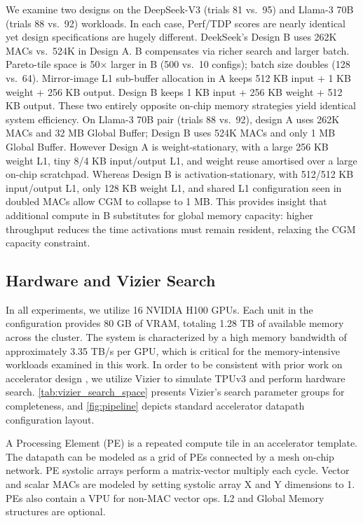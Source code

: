 We examine two designs on the DeepSeek-V3  (trials 81 vs.\ 95) and Llama-3 70B (trials 88 vs.\ 92) workloads. In each case, Perf/TDP scores are nearly identical yet design specifications are hugely different. DeekSeek's Design B uses 262K MACs vs.\ 524K in Design A. B compensates via richer search and larger batch. Pareto-tile space is 50$\times$ larger in B (500 vs.\ 10 configs); batch size doubles (128 vs.\ 64). Mirror-image L1 sub-buffer allocation in A keeps 512 KB input + 1 KB weight + 256 KB output. Design B keeps 1 KB input + 256 KB weight + 512 KB output. These two entirely opposite on-chip memory strategies yield identical system efficiency. On Llama-3 70B pair (trials 88 vs.\ 92), design A uses 262K MACs and 32 MB Global Buffer; Design B uses 524K MACs and only 1 MB Global Buffer. However Design A is weight-stationary, with a large 256 KB weight L1, tiny 8/4 KB input/output L1, and weight reuse amortised over a large on-chip scratchpad. Whereas Design B is activation-stationary, with 512/512 KB input/output L1, only 128 KB weight L1, and shared L1 configuration seen in doubled MACs allow CGM to collapse to 1 MB. This provides insight that additional compute in B substitutes for global memory capacity: higher throughput reduces the time activations must remain resident, relaxing the CGM capacity constraint. 


\subsection{Hardware and Vizier Search}

In all experiments, we utilize 16 NVIDIA H100 GPUs. Each unit in the configuration provides 80 GB of VRAM, totaling 1.28 TB of available memory across the cluster. The system is characterized by a high memory bandwidth of approximately 3.35 TB/s per GPU, which is critical for the memory-intensive workloads examined in this work. In order to be consistent with prior work on accelerator design \citep{zhang_fast}, we utilize Vizier to simulate TPUv3 and perform hardware search. \cref{tab:vizier_search_space} presents Vizier's search parameter groups for completeness, and \cref{fig:pipeline} depicts standard accelerator datapath configuration layout. 

A Processing Element (PE) is a repeated compute tile in an accelerator template.
The datapath can be modeled as a grid of PEs connected by a mesh on-chip network.
PE systolic arrays perform a matrix-vector multiply each cycle. 
Vector and scalar MACs are modeled by setting systolic array X and Y dimensions to 1. 
PEs also contain a VPU for non-MAC vector ops. 
L2 and Global Memory structures are optional. 

